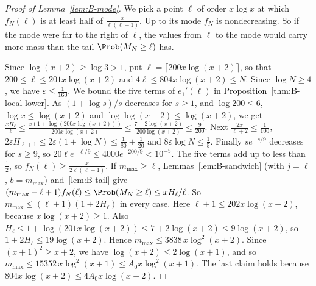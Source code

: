 \begin{proof}[Proof of Lemma~\ref{lem:B-mode}]
We pick a point $\ell$ of order $x\log x$ at which $f_N(\ell)$ is at least
half of $\frac x{\ell(\ell+1)}$. Up to its mode $f_N$ is nondecreasing. So
if the mode were far to the right of $\ell$, the values from $\ell$ to the
mode would carry more mass than the tail $\Prob(M_N\ge\ell)$ has.

Since $\log(x+2)\ge\log3>1$, put $\ell=\lceil200x\log(x+2)\rceil$, so that $200\le\ell\le201x\log(x+2)$
and $4\ell\le804x\log(x+2)\le N$. Since $\log N\ge4$, we have $\varepsilon\le\frac1{160}$. We bound
the five terms of $e_1'(\ell)$ in Proposition~\ref{thm:B-local-lower}. As $(1+\log s)/s$
decreases for $s\ge1$, and $\log200\le6$, $\log x\le \log(x+2)$ and $\log \log(x+2)\le \log(x+2)$, we get
$\frac{xH_\ell}\ell\le\frac{x(1+\log(200x\log(x+2)))}{200x\log(x+2)}\le\frac{7+2\log(x+2)}{200\log(x+2)}\le\frac9{200}$.
Next $\frac{2x}{\ell+2}\le\frac1{100}$,
$2\varepsilon H_{\ell+1}\le2\varepsilon(1+\log N)\le\frac1{80}+\frac1{20}$ and
$8\varepsilon\log N\le\frac15$. Finally $se^{-s/9}$ decreases for $s\ge9$, so
$20\ell e^{-\ell/9}\le4000e^{-200/9}<10^{-5}$. The five terms add up to less than $\frac12$, so
$f_N(\ell)\ge\frac x{2\ell(\ell+1)}$. If $m_{\max}\ge\ell$,
Lemmas~\ref{lem:B-sandwich} (with $j=\ell$, $b=m_{\max}$) and~\ref{lem:B-tail} give
$(m_{\max}-\ell+1)f_N(\ell)\le\Prob(M_N\ge\ell)\le xH_\ell/\ell$. So
$m_{\max}\le(\ell+1)(1+2H_\ell)$ in every case. Here $\ell+1\le202x\log(x+2)$, because $x\log(x+2)\ge1$. Also
$H_\ell\le1+\log(201x\log(x+2))\le7+2\log(x+2)\le9\log(x+2)$, so $1+2H_\ell\le19\log(x+2)$. Hence
$m_{\max}\le3838\,x\log^2(x+2)$. Since $(x+1)^2\ge x+2$, we have $\log(x+2)\le2\log(x+1)$, and so
$m_{\max}\le15352\,x\log^2(x+1)\le A_0x\log^2(x+1)$. The last claim holds because
$804x\log(x+2)\le4A_0x\log(x+2)$.
\end{proof}
